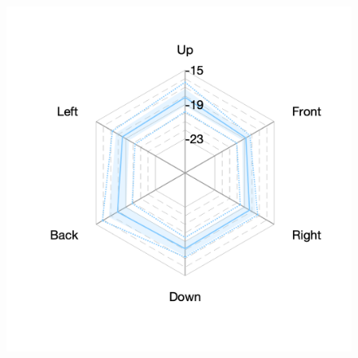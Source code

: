 \documentclass[11pt,a4j]{jreport}
\begin{document}
\begin{figure}[H]
\begin{minipage}[b]{.33\textwidth}
        \label{fig:ホールBにおけるSTlate}
      \end{minipage}%
      \begin{minipage}[b]{.33\textwidth}
        \centering
        \includegraphics[width=1\linewidth]{images/realHallDirSt/late_hall_c_allpoints.png}
        \label{fig:ホールCにおけるSTlate}
      \end{minipage}


\end{figure}
\end{document}
